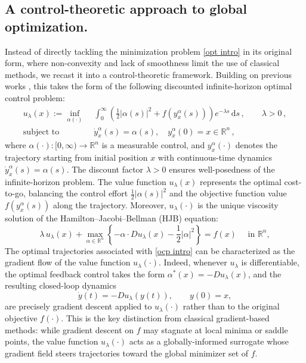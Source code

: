 \documentclass[12pt]{amsart}
\numberwithin{equation}{section}
\theoremstyle{plain}
\begin{document}
\subsection*{A control-theoretic approach to global optimization.}
Instead of directly tackling the minimization problem \eqref{opt intro} in its original form, where non-convexity and lack of smoothness limit the use of classical methods, we recast it into a control-theoretic framework. Building on previous works \cite{bardi2023eikonal,huang2025control}, this takes the form of the following discounted infinite-horizon optimal control problem:
\begin{equation}\label{ocp intro}
	\begin{aligned}
		u_{\lambda}(x) := \inf_{\alpha(\cdot)} \; & \int_{0}^{\infty} \left(\frac{1}{2}|\alpha(s)|^{2} + f(y_{x}^{\alpha}(s))\right) e^{-\lambda s}\,\mathrm{d}s\,,\qquad \lambda>0\,, \\
		\text{subject to} \quad & \dot{y}_{x}^{\alpha}(s) = \alpha(s), \quad y_{x}^{\alpha}(0)=x\in\mathbb{R}^n\,,
	\end{aligned}
\end{equation}
where $\alpha(\cdot):[0,\infty) \to \mathbb{R}^{n}$ is a measurable control, and $y_{x}^{\alpha}(\cdot)$ denotes the trajectory starting from initial position $x$ with continuous-time dynamics $\dot{y}_{x}^{\alpha}(s) = \alpha(s)$. The discount factor $\lambda>0$ ensures well-posedness of the infinite-horizon problem. The value function $u_{\lambda}(x)$ represents the optimal cost-to-go, balancing the control effort $\frac{1}{2}|\alpha(s)|^{2}$ and the objective function value $f(y_{x}^{\alpha}(s))$ along the trajectory. Moreover, $u_{\lambda}(\cdot)$ is the unique viscosity solution \cite{bardi1997optimal} of the Hamilton--Jacobi--Bellman (HJB) equation:
\begin{equation*}
	\lambda\, u_{\lambda}(x) + \max_{\alpha \in \mathbb{R}^n}\left\{ -\alpha \cdot Du_{\lambda}(x) - \frac{1}{2}|\alpha|^{2} \right\} = f(x) \quad \text{ in } \mathbb{R}^{n},
\end{equation*}
The optimal trajectories associated with \eqref{ocp intro} can be characterized as the gradient flow of the value function $u_\lambda(\cdot)$. Indeed, whenever $u_\lambda$ is differentiable, the optimal feedback control takes the form $\alpha^*(x) = -Du_\lambda(x)$, and the resulting closed-loop dynamics
\begin{equation*}
	\dot{y}(t) = -Du_\lambda(y(t)), \qquad y(0) = x,
\end{equation*}
are precisely gradient descent applied to $u_\lambda(\cdot)$ rather than to the original objective $f(\cdot)$. This is the key distinction from classical gradient-based methods: while gradient descent on $f$ may stagnate at local minima or saddle points, the value function $u_\lambda(\cdot)$ acts as a globally-informed surrogate whose gradient field steers trajectories toward the global minimizer set of $f$.
\end{document}
